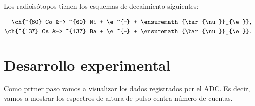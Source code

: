 \documentclass[12pt]{article}
\begin{document}
        Los radioisótopos tienen los esquemas de decaimiento siguientes:

        \begin{align*}
            \ch{^{60} Co &-> ^{60} Ni + \e^{-} + \ensuremath{\bar{\nu}}_{\e}},\\
            \ch{^{137} Cs &-> ^{137} Ba + \e^{-} + \ensuremath{\bar{\nu}}_{\e}}.
        \end{align*}
    
    \pagebreak
    \section*{Desarrollo experimental}
        Como primer paso vamos a visualizar los dados registrados por el ADC. Es decir, vamos a mostrar los espectros de altura de pulso contra número de cuentas.
\end{document}
